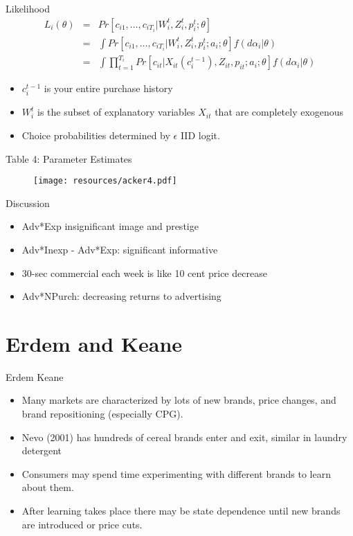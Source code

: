 \begin{frame}{Likelihood}
\begin{eqnarray*}
L_i(\theta) &=& Pr[c_{i1},\ldots,c_{iT_i} | W_i^t, Z_i^t, p_i^t; \theta] \\
&=& \int Pr[c_{i1},\ldots,c_{iT_i} | W_i^t, Z_i^t, p_i^t; a_i;  \theta] f(d \alpha_i | \theta)\\
&=& \int \prod_{t=1}^{T_i} Pr[c_{it}|  X_{it}(c_{i}^{t-1}), Z_{it}, p_{it}; a_i;  \theta] f(d \alpha_i | \theta)
\end{eqnarray*}
\begin{itemize}
\item $c_{i}^{t-1}$ is your entire purchase history
\item $W_{i}^t$ is the subset of explanatory variables $X_{it}$ that are completely exogenous
\item Choice probabilities determined by $\epsilon$ IID logit.
\end{itemize}
\end{frame}

\begin{frame}{Table 4: Parameter Estimates}
\begin{figure}[htbp]
\begin{center}
\texttt{[image: resources/acker4.pdf]}
\label{default}
\end{center}
\end{figure}
\end{frame}

\begin{frame}{Discussion}
\begin{itemize}
\item Adv*Exp \alert{insignificant} image and prestige
\item Adv*Inexp - Adv*Exp: \alert{significant} informative
\item 30-sec commercial each week is like 10 cent price decrease
\item Adv*NPurch: decreasing returns to advertising
\end{itemize}
\end{frame}

\section*{Erdem and Keane}

\begin{frame}{Erdem Keane}
\begin{itemize}
\item Many markets are characterized by lots of new brands, price changes, and brand repositioning (especially CPG).
\item Nevo (2001) has hundreds of cereal brands enter and exit, similar in laundry detergent
\item Consumers may spend time experimenting with different brands to learn about them.
\item After learning takes place there may be state dependence until new brands are introduced or price cuts.
\end{itemize}
\end{frame} 

